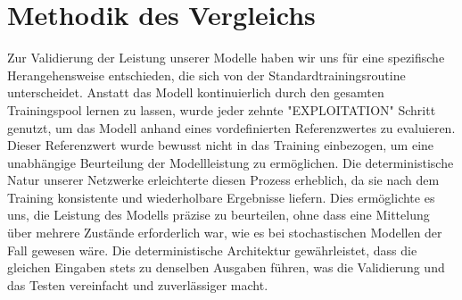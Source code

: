 \section{Methodik des Vergleichs}
Zur Validierung der Leistung unserer Modelle haben wir uns für eine spezifische Herangehensweise entschieden, die sich von der Standardtrainingsroutine unterscheidet. Anstatt das Modell kontinuierlich durch den gesamten Trainingspool lernen zu lassen, wurde jeder zehnte "EXPLOITATION" Schritt genutzt, um das Modell anhand eines vordefinierten Referenzwertes zu evaluieren. Dieser Referenzwert wurde bewusst nicht in das Training einbezogen, um eine unabhängige Beurteilung der Modellleistung zu ermöglichen. Die deterministische Natur unserer Netzwerke erleichterte diesen Prozess erheblich, da sie nach dem Training konsistente und wiederholbare Ergebnisse liefern. Dies ermöglichte es uns, die Leistung des Modells präzise zu beurteilen, ohne dass eine Mittelung über mehrere Zustände erforderlich war, wie es bei stochastischen Modellen der Fall gewesen wäre. Die deterministische Architektur gewährleistet, dass die gleichen Eingaben stets zu denselben Ausgaben führen, was die Validierung und das Testen vereinfacht und zuverlässiger macht.
